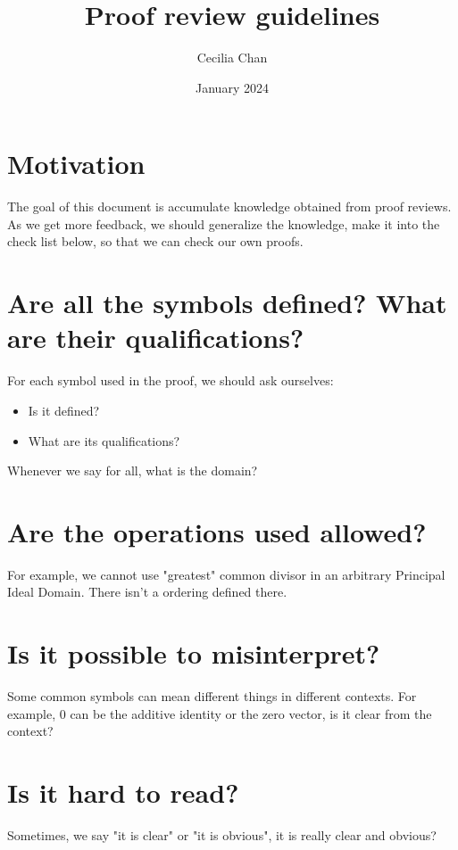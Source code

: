 \documentclass{article}
\title{Proof review guidelines}
\author{Cecilia Chan}
\date{January 2024}
\begin{document}
\maketitle

\section*{Motivation}
The goal of this document is accumulate knowledge obtained from proof reviews. As we get more feedback, we should generalize the knowledge, make it into the check list below, so that we can check our own proofs. 

\section*{Are all the symbols defined? What are their qualifications?}
For each symbol used in the proof, we should ask ourselves:
\begin{itemize}
    \item Is it defined?
    \item What are its qualifications?
\end{itemize}
Whenever we say for all, what is the domain?

\section*{Are the operations used allowed?}
For example, we cannot use "greatest" common divisor in an arbitrary Principal Ideal Domain. There isn't a ordering defined there.

\section*{Is it possible to misinterpret?}
Some common symbols can mean different things in different contexts. For example, 0 can be the additive identity or the zero vector, is it clear from the context?

\section*{Is it hard to read?}
Sometimes, we say "it is clear" or "it is obvious", it is really clear and obvious? 
\end{document}

